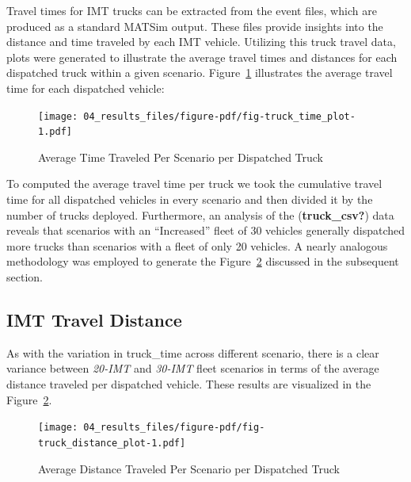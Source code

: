 \documentclass[fancy, oneside, mastersfancy, ms]{byuthesis}
\begin{document}
Travel times for IMT trucks can be extracted from the event files, which
are produced as a standard MATSim output. These files provide insights
into the distance and time traveled by each IMT vehicle. Utilizing this
truck travel data, plots were generated to illustrate the average travel
times and distances for each dispatched truck within a given scenario.
Figure~\ref{fig-truck_time_plot} illustrates the average travel time for
each dispatched vehicle:

\begin{figure}

{\centering \texttt{[image: 04\_results\_files/figure-pdf/fig-truck\_time\_plot-1.pdf]}

}

\caption{\label{fig-truck_time_plot}Average Time Traveled Per Scenario
per Dispatched Truck}

\end{figure}

To computed the average travel time per truck we took the cumulative
travel time for all dispatched vehicles in every scenario and then
divided it by the number of trucks deployed. Furthermore, an analysis of
the (\textbf{truck\_csv?}) data reveals that scenarios with an
``Increased'' fleet of 30 vehicles generally dispatched more trucks than
scenarios with a fleet of only 20 vehicles. A nearly analogous
methodology was employed to generate the
Figure~\ref{fig-truck_distance_plot} discussed in the subsequent
section.

\hypertarget{imt-travel-distance}{%
\subsection{IMT Travel Distance}\label{imt-travel-distance}}

As with the variation in truck\_time across different scenario, there is
a clear variance between \emph{20-IMT} and \emph{30-IMT} fleet scenarios
in terms of the average distance traveled per dispatched vehicle. These
results are visualized in the Figure~\ref{fig-truck_distance_plot}.

\begin{figure}

{\centering \texttt{[image: 04\_results\_files/figure-pdf/fig-truck\_distance\_plot-1.pdf]}

}

\caption{\label{fig-truck_distance_plot}Average Distance Traveled Per
Scenario per Dispatched Truck}

\end{figure}
\end{document}
